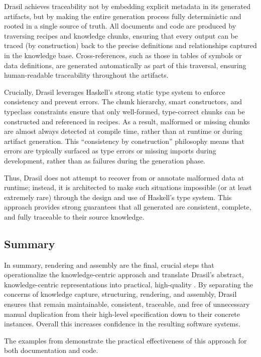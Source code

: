 Drasil achieves traceability not by embedding explicit metadata in its 
generated artifacts, but by making the entire generation process fully 
deterministic  and rooted in a single source 
of truth. All documents and code 
are produced by traversing recipes and knowledge chunks, ensuring that every 
output can be traced (by construction) back to the precise definitions and 
relationships captured in the knowledge base. Cross-references, such as those 
in tables of symbols or data definitions, are generated automatically as part 
of this traversal, ensuring human-readable traceability throughout the 
artifacts.

Crucially, Drasil leverages Haskell's strong static type system to enforce 
consistency and prevent errors. The chunk hierarchy, smart constructors, and 
typeclass constraints ensure that only well-formed, type-correct chunks can be 
constructed and referenced in recipes. As a result, malformed or missing chunks 
are almost always detected at compile time, rather than at runtime or during 
artifact generation. This “consistency by construction” philosophy means that 
errors are typically surfaced as type errors or missing imports during 
development, rather than as failures during the generation phase.

Thus, Drasil does not attempt to recover from or annotate malformed data at 
runtime; instead, it is architected to make such situations impossible (or at 
least extremely rare) through the design and use of Haskell's type system. This 
approach provides strong guarantees that all generated \sfs{} are 
consistent, complete, and fully traceable to their source knowledge.

\subsection{Summary}
In summary, rendering and assembly are the final, crucial steps that 
operationalize the knowledge-centric approach and translate Drasil's abstract, 
knowledge-centric representations into practical, high-quality \sfs{}. By 
separating the concerns of knowledge capture, structuring, rendering, and 
assembly, Drasil ensures that \sfs{} remain maintainable, consistent, 
traceable, and free of unnecessary manual duplication from their high-level 
specification down to their concrete instances. Overall this increases 
confidence in the resulting software systems.

The examples from \gb{} demonstrate the practical effectiveness of this 
approach for both documentation and code.

